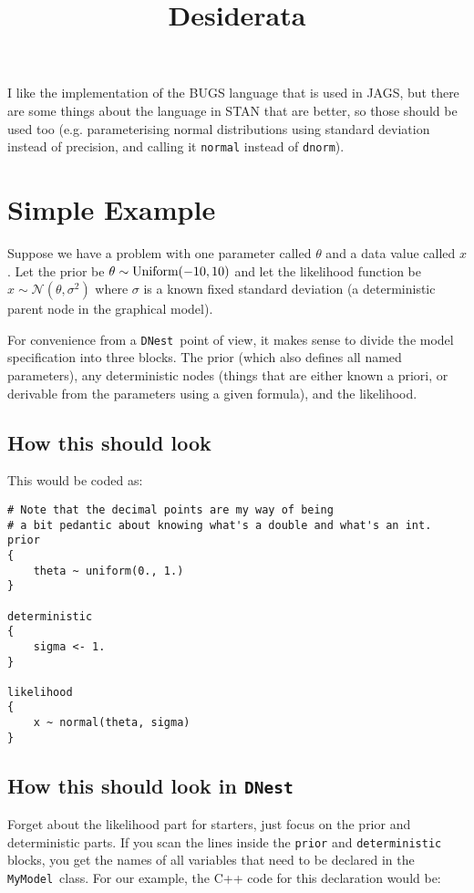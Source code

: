 \documentclass[letterpaper, 11pt]{article}
\title{Desiderata}
\newcommand{\dnest}{{\tt DNest}}
\newcommand{\mymodel}{{\tt MyModel}}
\begin{document}
\maketitle


I like the implementation of the BUGS language that is used in JAGS, but there
are some things about the language in STAN that are better, so those should
be used too (e.g. parameterising normal distributions using standard deviation
instead of precision, and calling it {\tt normal} instead of {\tt dnorm}).

\section{Simple Example}
Suppose we have a problem with one parameter called $\theta$ and a data value
called $x$. Let
the prior be $\theta \sim \textnormal{Uniform}(-10, 10)$ and let the likelihood
function
be $x \sim \mathcal{N}(\theta, \sigma^2)$ where $\sigma$ is a known fixed
standard deviation (a deterministic parent node in the graphical model).

For convenience from a \dnest~point of view, it makes sense to divide
the model specification into three blocks. The prior (which also defines all
named parameters), any deterministic nodes (things that are either known
a priori, or
derivable from the parameters using a given formula), and the likelihood.

\subsection{How this should look}

This would be coded as:
\begin{verbatim}
# Note that the decimal points are my way of being
# a bit pedantic about knowing what's a double and what's an int.
prior
{
    theta ~ uniform(0., 1.)
}

deterministic
{
    sigma <- 1.
}

likelihood
{
    x ~ normal(theta, sigma)
}
\end{verbatim}

\subsection{How this should look in \dnest}
Forget about the likelihood part for starters, just focus on the prior and
deterministic parts. If you scan the lines inside the {\tt prior} and
{\tt deterministic} blocks, you get the names of all variables that need to
be declared in the \mymodel~class. For our example, the C++ code for this
declaration would be:
\end{document}
